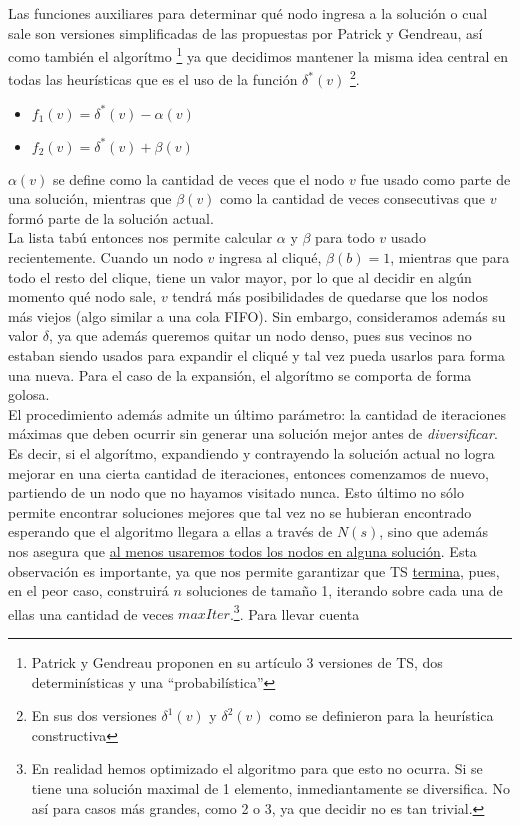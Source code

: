 Las funciones auxiliares para determinar qué nodo ingresa a la solución o cual sale son versiones simplificadas de las propuestas por Patrick y Gendreau, así como también el algorítmo 
\footnote{Patrick y Gendreau proponen en su artículo 3 versiones de TS, dos determinísticas y una ``probabilística''} ya que decidimos mantener la misma idea central en todas las heurísticas 
que es el uso de la función $\delta^{*}(v)$ \footnote{En sus dos versiones $\delta^{1}(v)$ y $\delta^{2}(v)$ como se definieron para la heurística constructiva}.
\begin{itemize}
  \item $f_1(v) = \delta^{*}(v) - \alpha(v)$
  \item $f_2(v) = \delta^{*}(v) + \beta(v)$
\end{itemize}
$\alpha(v)$ se define como la cantidad de veces que el nodo $v$ fue usado como parte de una solución, mientras que $\beta(v)$ como la cantidad de veces consecutivas que $v$ formó parte 
de la solución actual. \\ 
La lista tabú entonces nos permite calcular $\alpha$ y $\beta$ para todo $v$ usado recientemente. Cuando un nodo $v$ ingresa al cliqué, $\beta(b)=1$, mientras 
que para todo el resto del clique, tiene un valor mayor, por lo que al decidir en algún momento qué nodo sale, $v$ tendrá más posibilidades de quedarse que los nodos más viejos 
(algo similar a una cola FIFO). Sin embargo, consideramos además su valor $\delta$, ya que además queremos quitar un nodo denso, pues sus vecinos no estaban siendo usados para expandir el cliqué
y tal vez pueda usarlos para forma una nueva. Para el caso de la expansión, el algorítmo se comporta de forma golosa. \\
El procedimiento además admite un último parámetro: la cantidad de iteraciones máximas que deben ocurrir sin generar una solución mejor antes de \textit{diversificar}. Es decir, 
si el algorítmo, expandiendo y contrayendo la solución actual no logra mejorar en una cierta cantidad de iteraciones, entonces comenzamos de nuevo, partiendo de un nodo que no hayamos visitado nunca. 
Esto último no sólo permite encontrar soluciones mejores que tal vez no se hubieran encontrado esperando que el algoritmo llegara a ellas a través de $N(s)$, sino que además nos 
asegura que \underline{al menos usaremos todos los nodos en alguna solución}. Esta observación es importante, ya que nos permite garantizar que TS \underline{termina}, pues, en el peor 
caso, construirá $n$ soluciones de tamaño 1, iterando sobre cada una de ellas una cantidad de veces $maxIter$.\footnote{En realidad hemos optimizado el algoritmo para que esto no ocurra. Si 
se tiene una solución maximal de 1 elemento, inmediantamente se diversifica. No así para casos más grandes, como 2 o 3, ya que decidir no es tan trivial.}. Para llevar cuenta 
